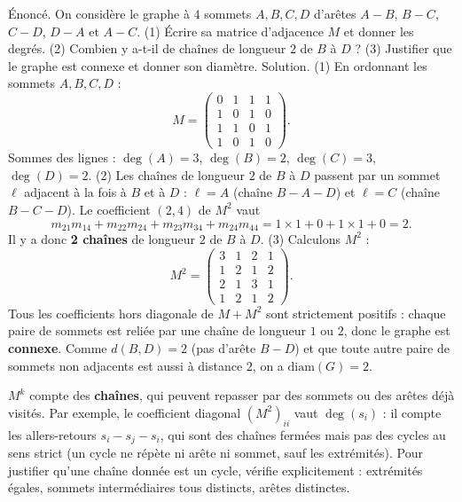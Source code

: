 \documentclass[11pt]{article}
\newcommand{\cle}[1]{{\popxbold\color{popdark}#1}}
\begin{document}
\begin{exoresolu}
Énoncé. On considère le graphe à $4$ sommets $A, B, C, D$ d'arêtes $A\!-\!B$, $B\!-\!C$, $C\!-\!D$, $D\!-\!A$ et $A\!-\!C$. (1) Écrire sa matrice d'adjacence $M$ et donner les degrés. (2) Combien y a-t-il de chaînes de longueur $2$ de $B$ à $D$ ? (3) Justifier que le graphe est connexe et donner son diamètre.
\tcblower
Solution. (1) En ordonnant les sommets $A, B, C, D$ :
\[ M = \begin{pmatrix} 0 & 1 & 1 & 1 \\ 1 & 0 & 1 & 0 \\ 1 & 1 & 0 & 1 \\ 1 & 0 & 1 & 0 \end{pmatrix}. \]
Sommes des lignes : $\deg(A) = 3$, $\deg(B) = 2$, $\deg(C) = 3$, $\deg(D) = 2$.
(2) Les chaînes de longueur $2$ de $B$ à $D$ passent par un sommet $\ell$ adjacent à la fois à $B$ et à $D$ : $\ell = A$ (chaîne $B\!-\!A\!-\!D$) et $\ell = C$ (chaîne $B\!-\!C\!-\!D$). Le coefficient $(2,4)$ de $M^2$ vaut
\[ m_{21}m_{14} + m_{22}m_{24} + m_{23}m_{34} + m_{24}m_{44} = 1\times 1 + 0 + 1\times 1 + 0 = 2. \]
Il y a donc \textbf{2 chaînes} de longueur $2$ de $B$ à $D$.
(3) Calculons $M^2$ :
\[ M^2 = \begin{pmatrix} 3 & 1 & 2 & 1 \\ 1 & 2 & 1 & 2 \\ 2 & 1 & 3 & 1 \\ 1 & 2 & 1 & 2 \end{pmatrix}. \]
Tous les coefficients hors diagonale de $M + M^2$ sont strictement positifs : chaque paire de sommets est reliée par une chaîne de longueur $1$ ou $2$, donc le graphe est \textbf{connexe}. Comme $d(B,D) = 2$ (pas d'arête $B\!-\!D$) et que toute autre paire de sommets non adjacents est aussi à distance $2$, on a $\mathrm{diam}(G) = 2$.
\end{exoresolu}

\begin{attention}
$M^k$ compte des \textbf{chaînes}, qui peuvent repasser par des sommets ou des arêtes déjà visités. Par exemple, le coefficient diagonal $(M^2)_{ii}$ vaut $\deg(s_i)$ : il compte les allers-retours $s_i - s_j - s_i$, qui sont des chaînes fermées mais pas des cycles au sens strict (un cycle ne répète ni arête ni sommet, sauf les extrémités). Pour justifier qu'une chaîne donnée est un \cle{cycle}, vérifie explicitement : extrémités égales, sommets intermédiaires tous distincts, arêtes distinctes.
\end{attention}
\end{document}
